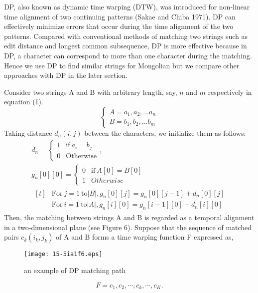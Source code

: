 \documentclass[english]{jnlp_1.4}
\begin{document}
DP, also known as dynamic time warping (DTW), was introduced for non-linear 
time alignment of two continuing patterns (Sakae and Chiba 1971). DP can 
effectively minimize errors that occur during the time alignment of the two 
patterns. Compared with conventional methods of matching two strings such as 
edit distance and longest common subsequence, DP is more effective because 
in DP, a character can correspond to more than one character during the 
matching. Hence we use DP to find similar strings for Mongolian but we 
compare other approaches with DP in the later section.

Consider two strings A and B with arbitrary length, say, $n$ and $m$ respectively 
in equation (1).
\begin{equation}
 \begin{cases}
	A=a_{1}, a_{2}, … a_{n}\\
	B=b_{1}, b_{2}, … b_{m}
\end{cases}
\end{equation}
Taking distance $d_{n}(i,j)$ between the characters, we initialize them as follows:
\begin{gather}
 d_{n}=
  \begin{cases}
	1 & \text{if}\  a_{i}=b_{j} \\
	0 & \text{Otherwise}
  \end{cases}, \\
 g_{n}[0][0]=
  \begin{cases}
	0 & \text{if} \ A[0]=B[0] \\
	1 & Otherwise
  \end{cases}\\
 \begin{aligned}[t]
	{} & \text{For} \  j=1 \ \text{to} |B|, g_{n}[0][j]=g_{n}[0][j-1]+d_{n}[0][j]  \\
	{} & \text{For} \  i=1 \ \text{to} |A|, g_{n}[i][0]=g_{n}[i-1][0]+d_{n}[i][0]
 \end{aligned}
\end{gather}
Then, the matching between strings A and B is regarded as a temporal 
alignment in a two-dimensional plane (see Figure 6). Suppose that the 
sequence of matched pairs $c_{k}(i_{k},j_{k})$ of A and B forms a time warping function F expressed as,
\begin{figure}[t]
\centerline{\texttt{[image: 15-5ia1f6.eps]}}
\caption{an example of DP matching path}
\vspace{-1\baselineskip}
\end{figure}
\begin{equation}
 F=c_{1}, c_{2}, \cdots, c_{k}, \cdots, c_{K}. 
\end{equation}
\end{document}
